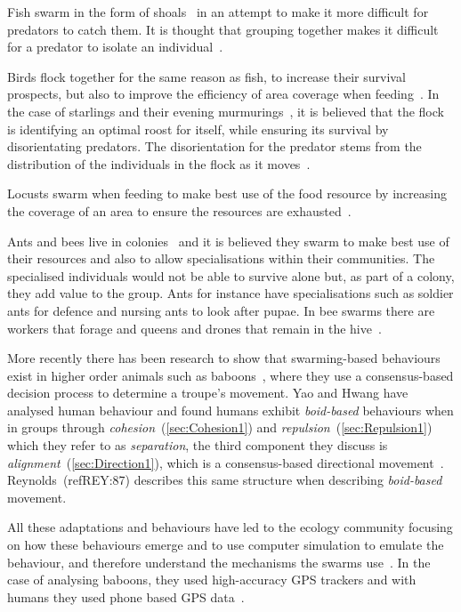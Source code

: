 Fish swarm in the form of shoals~\cite{PMRT:14} in an attempt to make it more difficult for predators to catch them. It is thought that grouping together makes it difficult for a predator to isolate an individual~\cite{MP:87}.

Birds flock together for the same reason as fish, to increase their survival prospects, but also to improve the efficiency of area coverage when feeding~\cite{PMRT:14}. In the case of starlings and their evening murmurings~\cite{YSCGL:12}, it is believed that the flock is identifying an optimal roost for itself, while ensuring its survival by disorientating predators. The disorientation for the predator stems from the distribution of the individuals in the flock as it moves~\cite{CCGP:10}.

Locusts swarm when feeding to make best use of the food resource by increasing the coverage of an area to ensure the resources are exhausted~\cite{GSSC:12, TDEB:12}.

Ants and bees live in colonies~\cite{MK:15, SVP:06} and it is believed they swarm to make best use of their resources and also to allow specialisations within their communities. The specialised individuals would not be able to survive alone but, as part of a colony, they add value to the group. Ants for instance have specialisations such as soldier ants for defence and nursing ants to look after pupae. In bee swarms there are workers that forage and queens and drones that remain in the hive~\cite{BBKA:ND}.

More recently there has been research to show that swarming-based behaviours exist in higher order animals such as baboons~\cite{SFDCIC:15}, where they use a consensus-based decision process to determine a troupe's movement. Yao and Hwang have analysed human behaviour and found humans exhibit \emph{boid-based} behaviours when in groups through \emph{cohesion}~(\autoref{sec:Cohesion1}) and \emph{repulsion}~(\autoref{sec:Repulsion1}) which they refer to as \emph{separation}, the third component they discuss is \emph{alignment}~(\autoref{sec:Direction1}), which is a consensus-based directional movement~\cite{YH:14}. Reynolds~(ref{REY:87}) describes this same structure when describing \emph{boid-based} movement.

All these adaptations and behaviours have led to the ecology community focusing on how these behaviours emerge and to use computer simulation to emulate the behaviour, and therefore understand the mechanisms the swarms use~\cite{ENNT:10}. In the case of analysing baboons, they used high-accuracy GPS trackers and with humans they used phone based GPS data~\cite{SFDCIC:15}.

